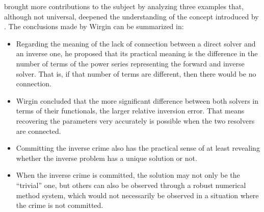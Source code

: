 			\cite{wirgin2004inverse} brought more contributions to the subject by analyzing three examples that, although not universal, deepened the understanding of the concept introduced by \cite{colton2019inverse}. The conclusions made by Wirgin can be summarized in:
			\begin{itemize}
				\item Regarding the meaning of the lack of connection between a direct solver and an inverse one, he proposed that its practical meaning is the difference in the number of terms of the power series representing the forward and inverse solver. That is, if that number of terms are different, then there would be no connection.
				\item Wirgin concluded that the more significant difference between both solvers in terms of their functionals, the larger relative inversion error. That means recovering the parameters very accurately is possible when the two resolvers are connected.
				\item Committing the inverse crime also has the practical sense of at least revealing whether the inverse problem has a unique solution or not.
				\item When the inverse crime is committed, the solution may not only be the ``trivial'' one, but others can also be observed through a robust numerical method system, which would not necessarily be observed in a situation where the crime is not committed.
			\end{itemize}
		
